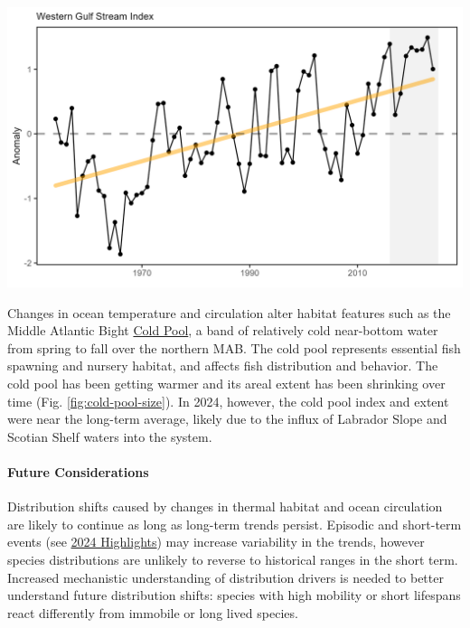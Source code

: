 \documentclass[
  10pt,
]{article}
\let\origfigure\figure
\let\endorigfigure\endfigure
\renewenvironment{figure}[1][2] {
    \expandafter\origfigure\expandafter[H]
} {
    \endorigfigure
}
\begin{document}
\begin{figure}

{\centering \includegraphics[width=6.5in]{images/BothReports/west_gsi_BothReports_2025-09-09} 

}

\caption{Index representing changes in the location of the western (between 64 and 55 degrees W) Gulf Stream north wall (black). Positive values represent a more northerly Gulf Stream position, with increasing trend (orange).}\label{fig:GSI}
\end{figure}

Changes in ocean temperature and circulation alter habitat features such as the Middle Atlantic Bight \href{https://noaa-edab.github.io/catalog/cold_pool.html}{Cold Pool}, a band of relatively cold near-bottom water from spring to fall over the northern MAB. The cold pool represents essential fish spawning and nursery habitat, and affects fish distribution and behavior. The cold pool has been getting warmer and its areal extent has been shrinking over time (Fig. \ref{fig:cold-pool-size}). In 2024, however, the cold pool index and extent were near the long-term average, likely due to the influx of Labrador Slope and Scotian Shelf waters into the system.

\paragraph{Future Considerations}\label{future-considerations}

Distribution shifts caused by changes in thermal habitat and ocean circulation are likely to continue as long as long-term trends persist. Episodic and short-term events (see \hyperref[highlights]{2024 Highlights}) may increase variability in the trends, however species distributions are unlikely to reverse to historical ranges in the short term. Increased mechanistic understanding of distribution drivers is needed to better understand future distribution shifts: species with high mobility or short lifespans react differently from immobile or long lived species.
\end{document}
